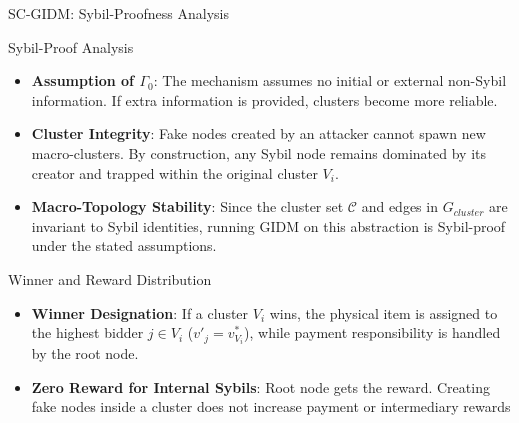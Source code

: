 \documentclass[10pt,aspectratio=169]{beamer}
\begin{document}
\begin{frame}{SC-GIDM: Sybil-Proofness Analysis}
\small
\begin{block}{Sybil-Proof Analysis}
\begin{itemize}
  \item \textbf{Assumption of $\Gamma_0$}: The mechanism assumes no initial or external non-Sybil information. If extra information is provided, clusters become more reliable.
  \item \textbf{Cluster Integrity}: Fake nodes created by an attacker cannot spawn new macro-clusters. By construction, any Sybil node remains dominated by its creator and trapped within the original cluster $V_i$.
  \item \textbf{Macro-Topology Stability}: Since the cluster set $\mathcal{C}$ and edges in $G_{cluster}$ are invariant to Sybil identities, running GIDM on this abstraction is Sybil-proof under the stated assumptions.
\end{itemize}
\end{block}

\begin{block}{Winner and Reward Distribution}
\begin{itemize}
  \item \textbf{Winner Designation}: If a cluster $V_i$ wins, the physical item is assigned to the highest bidder $j \in V_i$ ($v'_j = v^*_{V_i}$), while payment responsibility is handled by the root node.
  \item \textbf{Zero Reward for Internal Sybils}: Root node gets the reward. Creating fake nodes inside a cluster does not increase payment or intermediary rewards
\end{itemize}
\end{block}
\end{frame}
\end{document}
